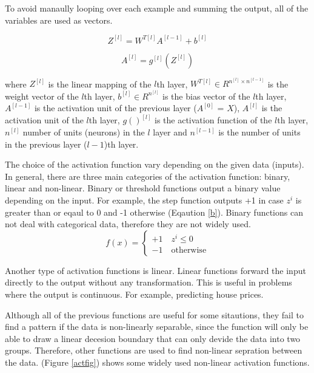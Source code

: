 \documentclass[runningheads]{llncs}
\begin{document}
To avoid manaully looping over each example and summing the output, all of the variables are used
as vectors.

\begin{equation}
    \label{zeq1}
        Z^{[l]} = W^{T[l]}A^{[l-1]} + b^{[l]}
\end{equation}

\begin{equation}
    \label{zeq2}
        A^{[l]} = g^{[l]}(Z^{[l]})
\end{equation}

where $Z^{[l]}$ is the linear mapping of the $l$th layer, $W^{T[l]} \in R^{n^{[l]} \times n^{[l-1]}}$ is the weight vector of the 
$l$th layer, $b^{[l]} \in R^{n^{[l]}}$ is the bias vector of the $l$th layer, $A^{[l-1]}$ is the activation unit
of the previous layer ($A^{[0]}$ = $X$), $A^{[l]}$ is the activation unit of the $l$th layer, 
$g()^{[l]}$ is the activation function of the $l$th layer, $n^{[l]}$ number of units (neurons) in the $l$ layer
and $n^{[l-1]}$ is the number of units in the previous layer ($l - 1$)th layer.


The choice of the activation function vary depending on the given data (inputs). 
In general, 
there are three main categories of the activation function: binary, linear and non-linear. 
Binary or threshold functions output a binary value depending on the input. 
For example, the step function outputs +1 in case $z^i$ is greater than or eqaul to 0 and -1 otherwise (Eqaution \ref{b}).
Binary functions can not deal with categorical data, therefore they are not widely used.
\begin{equation}
    \label{b}
f(x) = \left\{ \begin{array}{ll} +1 \quad z^i \leq 0 \\ -1 \quad \text{otherwise} \end{array} \right.
\end{equation}

Another type of activation functions is linear. 
Linear functions forward the input directly to the output without any transformation.
This is useful in problems where the output is continuous. For example, predicting house prices.

Although all of the previous functions are useful for some sitautions, 
they fail to find a pattern if the data is non-linearly separable, 
since the function will only be able to draw a linear decesion boundary that can only devide the data into two groups.
Therefore, other functions are used to find non-linear sepration between the data. 
(Figure \ref{actfig}) shows some widely used non-linear activation functions.
\end{document}
